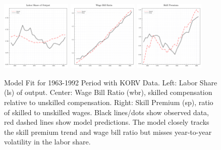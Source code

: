 \documentclass[12pt]{article}
\begin{document}
\begin{figure}[H]
 \centering
 \includegraphics[width=0.3\textwidth]{../images/fig:korv_estimation_ls_doc.pdf}
 \hfill
 \includegraphics[width=0.3\textwidth]{../images/fig:korv_estimation_wbr_doc.pdf}
 \hfill
 \includegraphics[width=0.3\textwidth]{../images/fig:korv_estimation_sp_doc.pdf}
 \caption{\label{fig:korv_estimation} Model Fit for 1963-1992 Period with KORV Data. Left: Labor Share (ls) of output. Center: Wage Bill Ratio (wbr), skilled compensation relative to unskilled compensation. Right: Skill Premium (sp), ratio of skilled to unskilled wages. Black lines/dots show observed data, red dashed lines show model predictions. The model closely tracks the skill premium trend and wage bill ratio but misses year-to-year volatility in the labor share.}
\end{figure}
\end{document}
